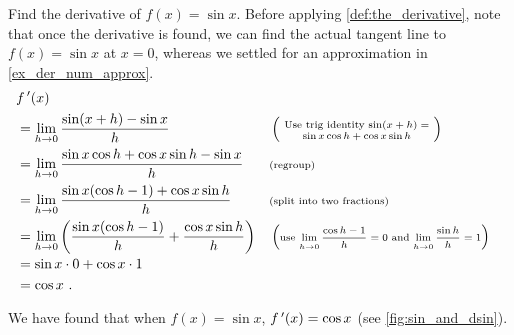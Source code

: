 \begin{example}\label{ex_deriv_sinx}%
Find the derivative of $f(x) = \sin x$.
\solution
Before applying \autoref{def:the_derivative}, note that once the derivative is found, we can find the actual tangent line to $f(x) = \sin x$ at $x=0$, whereas we settled for an approximation in \autoref{ex_der_num_approx}. 
	\small
	\begin{align*}
		&\fp(x)\\
		&= \lim_{h\to 0} \frac{\sin(x+h)-\sin x}{h} & & \left(\text{\scriptsize \parbox{110pt}{\centering Use trig identity \intertextmath{\sin(x+h) = \sin x\cos h+\cos x\sin h}}}\right) \\
		&= \lim_{h\to 0} \frac{\sin x\cos h+\cos x\sin h-\sin x}{h} & & \text{\scriptsize (regroup)}\\
		&= \lim_{h\to 0} \frac{\sin x(\cos h-1) + \cos x\sin h}{h} & & \text{\scriptsize (split into two fractions)}\\
		&= \lim_{h\to 0} \left(\frac{\sin x(\cos h-1)}{h} + \frac{\cos x\sin h}{h}\right) & & \left(\text{\scriptsize use $\ds \lim_{h\to 0} \frac{\cos h-1}{h} = 0$ and $\ds \lim_{h\to 0} \frac{\sin h}{h} = 1$}\right)\\
		&=	\sin x\cdot 0 + \cos x \cdot 1 \\
		&= \cos x\ .
	\end{align*}
\end{example} %

We have found that when $f(x) = \sin x$, $f\,'(x) = \cos x$ (see \autoref{fig:sin_and_dsin}).

